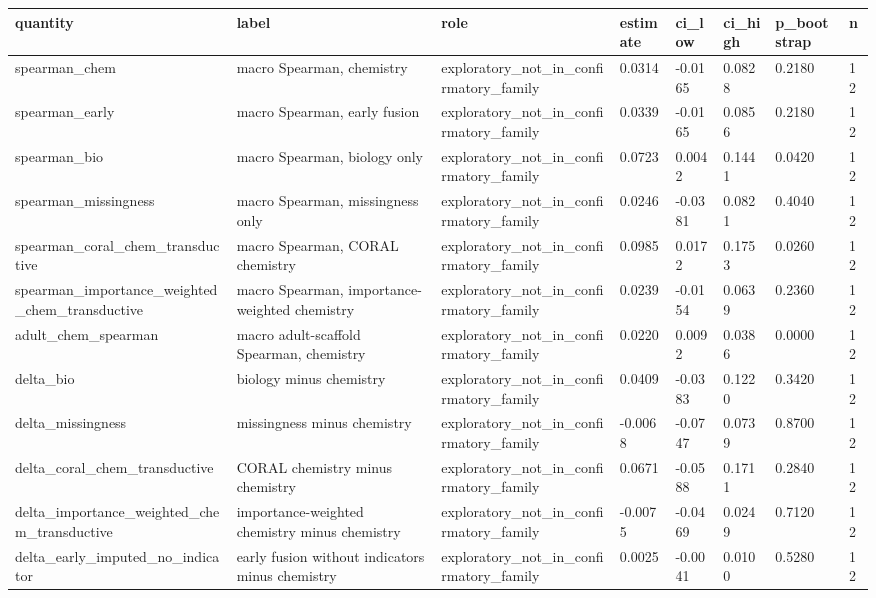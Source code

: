 \begin{tabular}{llllllll}
\hline
quantity & label & role & estimate & ci\_low & ci\_high & p\_bootstrap & n \\
\hline
spearman\_chem & macro Spearman, chemistry & exploratory\_not\_in\_confirmatory\_family & 0.0314 & -0.0165 & 0.0828 & 0.2180 & 12 \\
spearman\_early & macro Spearman, early fusion & exploratory\_not\_in\_confirmatory\_family & 0.0339 & -0.0165 & 0.0856 & 0.2180 & 12 \\
spearman\_bio & macro Spearman, biology only & exploratory\_not\_in\_confirmatory\_family & 0.0723 & 0.0042 & 0.1441 & 0.0420 & 12 \\
spearman\_missingness & macro Spearman, missingness only & exploratory\_not\_in\_confirmatory\_family & 0.0246 & -0.0381 & 0.0821 & 0.4040 & 12 \\
spearman\_coral\_chem\_transductive & macro Spearman, CORAL chemistry & exploratory\_not\_in\_confirmatory\_family & 0.0985 & 0.0172 & 0.1753 & 0.0260 & 12 \\
spearman\_importance\_weighted\_chem\_transductive & macro Spearman, importance-weighted chemistry & exploratory\_not\_in\_confirmatory\_family & 0.0239 & -0.0154 & 0.0639 & 0.2360 & 12 \\
adult\_chem\_spearman & macro adult-scaffold Spearman, chemistry & exploratory\_not\_in\_confirmatory\_family & 0.0220 & 0.0092 & 0.0386 & 0.0000 & 12 \\
delta\_bio & biology minus chemistry & exploratory\_not\_in\_confirmatory\_family & 0.0409 & -0.0383 & 0.1220 & 0.3420 & 12 \\
delta\_missingness & missingness minus chemistry & exploratory\_not\_in\_confirmatory\_family & -0.0068 & -0.0747 & 0.0739 & 0.8700 & 12 \\
delta\_coral\_chem\_transductive & CORAL chemistry minus chemistry & exploratory\_not\_in\_confirmatory\_family & 0.0671 & -0.0588 & 0.1711 & 0.2840 & 12 \\
delta\_importance\_weighted\_chem\_transductive & importance-weighted chemistry minus chemistry & exploratory\_not\_in\_confirmatory\_family & -0.0075 & -0.0469 & 0.0249 & 0.7120 & 12 \\
delta\_early\_imputed\_no\_indicator & early fusion without indicators minus chemistry & exploratory\_not\_in\_confirmatory\_family & 0.0025 & -0.0041 & 0.0100 & 0.5280 & 12 \\
\hline
\end{tabular}
